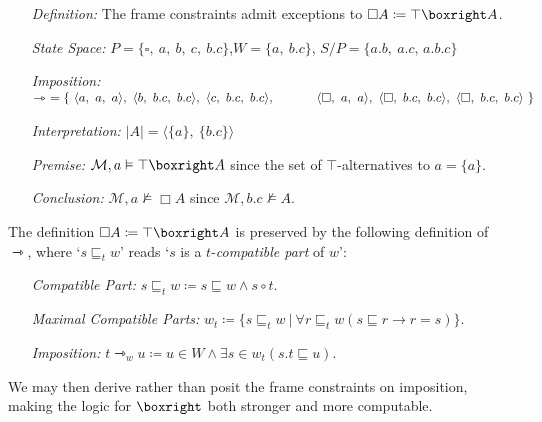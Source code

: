 \documentclass[a4paper, 11pt]{article} %
\theoremstyle{Pthm}
\newcommand{\tuple}[1]{\langle#1\rangle} %
\newcommand{\set}[1]{\lbrace#1\rbrace} %
\renewcommand{\vert}[1]{\lvert#1\rvert}
\begin{document}
\begin{enumerate}[leftmargin=1in]
  \item[\it Definition:] The frame constraints admit exceptions to $\Box A \coloneq \top \boxright A$.
  \item[\it State Space:] $P = \set{\square,\ a,\ b,\ c,\ b.c}$,\quad $W = \set{a,\ b.c}$, \quad $S/P = \set{a.b,\ a.c,\, a.b.c}$
  \item[\it Imposition:] $\rightarrowtriangle\ = \set{\
    \tuple{a,\ a,\ a},\ \tuple{b,\ b.c,\ b.c},\ \tuple{c,\ b.c,\ b.c},\\ 
    \strut\hspace{.46in} \tuple{\square,\ a,\ a},\ \tuple{\square,\ b.c,\ b.c},\ \tuple{\square,\ b.c,\ b.c}\ 
  }$
  \item[\it Interpretation:] $\vert{A} = \tuple{\set{a},\ \set{b.c}}$
  \item[\it Premise:] $\mathcal{M}, a \vDash \top \boxright A$ since the set of $\top$-alternatives to $a = \set{a}$.
  \item[\it Conclusion:] $\mathcal{M}, a \nvDash \Box A$ since $\mathcal{M}, b.c \nvDash A$.
\end{enumerate}
The definition $\Box A \coloneq \top \boxright A$ is preserved by the following definition of $\rightarrowtriangle$, where `$s \sqsubseteq_t w$' reads `$s$ is a $t$-\textit{compatible part} of $w$':
\begin{enumerate}[leftmargin=2in, itemsep=.05in]
  \item[\it Compatible Part:] $s \sqsubseteq_t w \coloneq s \sqsubseteq w \wedge s \circ t$. 
  \item[\it Maximal Compatible Parts:] $w_t \coloneq \set{s \sqsubseteq_t w \ |\ \forall r \sqsubseteq_t w (s \sqsubseteq r \rightarrow r = s)}$.
  \item[\it Imposition:] $t \rightarrowtriangle_w u \coloneq u \in W \wedge \exists s \in w_t(s.t \sqsubseteq u)$.
\end{enumerate}
We may then derive rather than posit the frame constraints on imposition, making the logic for $\boxright$ both stronger and more computable.

      
\end{document}
